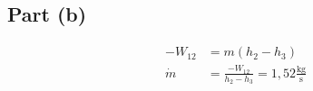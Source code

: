 \subsection*{Part (b)}

\begin{align*}
    -W_{12} &= m(h_2 - h_3) \\
    \dot{m} &= \frac{-W_{12}}{h_2 - h_3} = 1,52 \frac{\text{kg}}{\text{s}}
\end{align*}